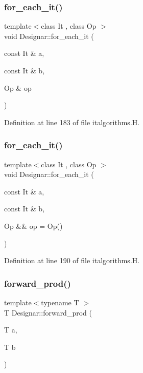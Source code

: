 \subsubsection{\texorpdfstring{for\+\_\+each\+\_\+it()}{for\_each\_it()}\hspace{0.1cm}{\footnotesize\ttfamily [1/2]}}
{\footnotesize\ttfamily template$<$class It , class Op $>$ \\
void Designar\+::for\+\_\+each\+\_\+it (\begin{DoxyParamCaption}\item[{const It \&}]{a,  }\item[{const It \&}]{b,  }\item[{Op \&}]{op }\end{DoxyParamCaption})}



Definition at line 183 of file italgorithms.\+H.

\mbox{\label{namespace_designar_a773f2843935a2d490b202240480d9e86}} 
\subsubsection{\texorpdfstring{for\+\_\+each\+\_\+it()}{for\_each\_it()}\hspace{0.1cm}{\footnotesize\ttfamily [2/2]}}
{\footnotesize\ttfamily template$<$class It , class Op $>$ \\
void Designar\+::for\+\_\+each\+\_\+it (\begin{DoxyParamCaption}\item[{const It \&}]{a,  }\item[{const It \&}]{b,  }\item[{Op \&\&}]{op = {\ttfamily Op()} }\end{DoxyParamCaption})}



Definition at line 190 of file italgorithms.\+H.

\mbox{\label{namespace_designar_a38bdfe24d16d5f665e10d75834cded69}} 
\subsubsection{\texorpdfstring{forward\+\_\+prod()}{forward\_prod()}}
{\footnotesize\ttfamily template$<$typename T $>$ \\
T Designar\+::forward\+\_\+prod (\begin{DoxyParamCaption}\item[{T}]{a,  }\item[{T}]{b }\end{DoxyParamCaption})}



